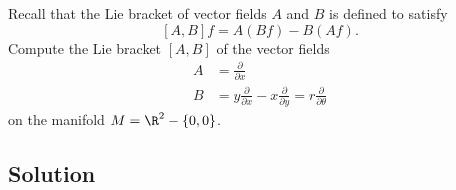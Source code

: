 \documentclass[12pt]{quiz}
\begin{document}
\maketitle

\noindent
Recall that the Lie bracket of vector fields $A$ and $B$ is defined to
satisfy
$$
[A,B]f = A(Bf) - B(Af).
$$
Compute the Lie bracket $[A,B]$ of the vector fields
\begin{align*}
A &=  \frac{\partial}{\partial x}\\
B &= y \frac{\partial}{\partial x} - x
  \frac{\partial}{\partial y} = r \frac{\partial}{\partial \theta}
\end{align*}
on the manifold $M = \R^2 - \{0,0\}$.
\subsection*{Solution}

\pagebreak
\null
\end{document}
